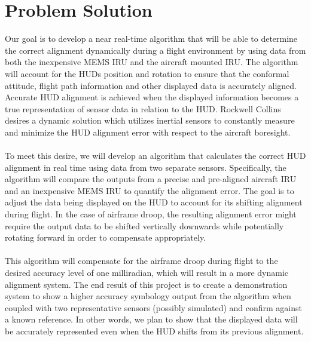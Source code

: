 \documentclass[letterpaper,10pt,onecolumn]{IEEEtran}
\begin{document}
\section{Problem Solution}
Our goal is to develop a near real-time algorithm that will be able to determine the correct alignment dynamically during a flight environment by using data from both the inexpensive MEMS IRU and the aircraft mounted IRU. The algorithm will account for the HUD\textquotesingle s position and rotation to ensure that the conformal attitude, flight path information and other displayed data is accurately aligned. Accurate HUD alignment is achieved when the displayed information becomes a true representation of sensor data in relation to the HUD. Rockwell Collins desires a dynamic solution which utilizes inertial sensors to constantly measure and minimize the HUD alignment error with respect to the aircraft boresight.\\\\
To meet this desire, we will develop an algorithm that calculates the correct HUD alignment in real time using data from two separate sensors. Specifically, the algorithm will compare the outputs from a precise and pre-aligned aircraft IRU and an inexpensive MEMS IRU to quantify the alignment error. The goal is to adjust the data being displayed on the HUD to account for its shifting alignment during flight. In the case of airframe droop, the resulting alignment error might require the output data to be shifted vertically downwards while potentially rotating forward in order to compensate appropriately.\\\\
This algorithm will compensate for the airframe droop during flight to the desired accuracy level of one milliradian, which will result in a more dynamic alignment system. The end result of this project is to create a demonstration system to show a higher accuracy symbology output from the algorithm when coupled with two representative sensors (possibly simulated) and confirm against a known reference. In other words, we plan to show that the displayed data will be accurately represented even when the HUD shifts from its previous alignment. 
\end{document}
